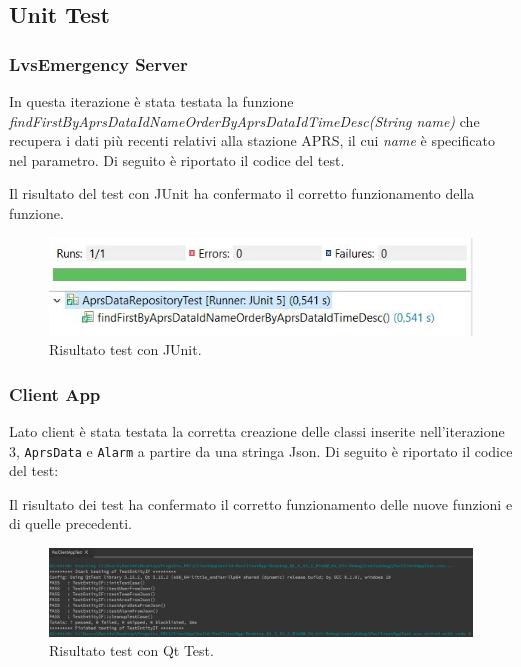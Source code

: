 \clearpage

\subsection{Unit Test}
\subsubsection{LvsEmergency Server}
In questa iterazione è stata testata la funzione \textit{findFirstByAprsDataIdNameOrderByAprsDataIdTimeDesc(String name)} che recupera i dati più recenti relativi alla stazione APRS, il cui \textit{name} è specificato nel parametro. Di seguito è riportato il codice del test.



Il risultato del test con JUnit ha confermato il corretto funzionamento della funzione.

\begin{figure}[h!]
	\centering
	\includegraphics[width=0.6\linewidth]{./Iterazione 3/ImageFiles/TestJUnit}
	\caption{Risultato test con JUnit.}
	\label{fig:RisultatiTestJunitIT3}
\end{figure}

\clearpage

\subsubsection{Client App}
Lato client è stata testata la corretta creazione delle classi inserite nell'iterazione 3, \texttt{AprsData} e \texttt{Alarm} a partire da una stringa Json. Di seguito è riportato il codice del test: 



Il risultato dei test ha confermato il corretto funzionamento delle nuove funzioni e di quelle precedenti. 

\begin{figure}[h!]
	\centering
	\includegraphics[width=1\linewidth]{./Iterazione 3/ImageFiles/testQt}
	\caption{Risultato test con Qt Test.}
	\label{fig:RisultatiTestQtIT3}
\end{figure}
\clearpage


